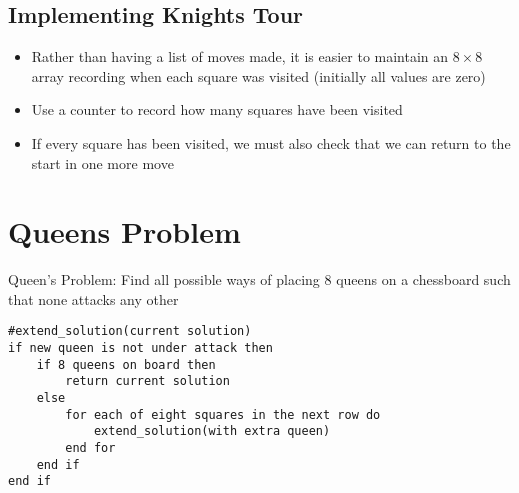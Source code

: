 \documentclass{article}[18pt]
\begin{document}
\subsection{Implementing Knights Tour}
\begin{itemize}
\item Rather than having a list of moves made, it is easier to maintain an $8\times8$ array recording when each square was visited (initially all values are zero)
\item Use a counter to record how many squares have been visited
\item If every square has been visited, we must also check that we can return to the start in one more move
\end{itemize}
\section{Queens Problem}
Queen's Problem: Find all possible ways of placing 8 queens on a chessboard such that none attacks any other
\begin{lstlisting}[mathescape=true]
#extend_solution(current solution)
if new queen is not under attack then
	if 8 queens on board then
		return current solution
	else
		for each of eight squares in the next row do
			extend_solution(with extra queen)
		end for
	end if
end if
\end{lstlisting}
\end{document}
